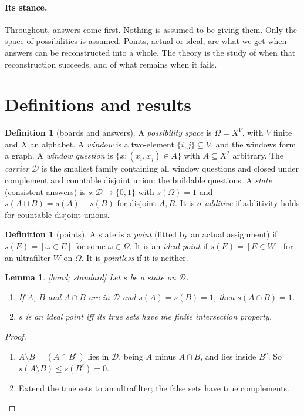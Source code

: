 \documentclass[11pt]{article}
\theoremstyle{plain}
\newtheorem{lemma}[theorem]{Lemma}
\theoremstyle{definition}
\newtheorem{definition}[theorem]{Definition}
\newcommand{\cD}{\mathcal{D}}
\newcommand{\st}[1]{\textsf{\small[#1]}}
\begin{document}
\paragraph{Its stance.} Throughout, answers come first. Nothing is assumed to
be giving them. Only the space of possibilities is assumed. Points, actual or
ideal, are what we get when answers can be reconstructed into a whole. The
theory is the study of when that reconstruction succeeds, and of what remains
when it fails.

\appendix
\section{Definitions and results}\label{app:defs}

\begin{definition}[boards and answers]
A \emph{possibility space} is $\Omega=X^V$, with $V$ finite and $X$ an alphabet.
A \emph{window} is a two-element $\{i,j\}\subseteq V$, and the windows form a
graph. A \emph{window question} is $\{x:(x_i,x_j)\in A\}$ with $A\subseteq X^2$
arbitrary. The \emph{carrier} $\cD$ is the smallest family containing all window
questions and closed under complement and countable disjoint union: the
buildable questions. A \emph{state} (consistent answers) is
$s:\cD\to\{0,1\}$ with $s(\Omega)=1$ and $s(A\sqcup B)=s(A)+s(B)$ for disjoint
$A,B$. It is \emph{$\sigma$-additive} if additivity holds for countable disjoint
unions.
\end{definition}

\begin{definition}[points]
A state is a \emph{point} (fitted by an actual assignment) if
$s(E)=[\omega\in E]$ for some $\omega\in\Omega$. It is an \emph{ideal point} if
$s(E)=[E\in W]$ for an ultrafilter $W$ on $\Omega$. It is \emph{pointless} if it
is neither.
\end{definition}

\begin{lemma}\label{lem:basic}\st{hand; standard}
Let $s$ be a state on $\cD$.
\begin{enumerate}[label=(\alph*),nosep]
  \item If $A$, $B$ and $A\cap B$ are in $\cD$ and $s(A)=s(B)=1$, then
    $s(A\cap B)=1$.
  \item $s$ is an ideal point iff its true sets have the finite intersection
    property.
\end{enumerate}
\end{lemma}
\begin{proof}
\begin{enumerate}[label=(\alph*),nosep]
  \item $A\setminus B=(A\cap B^c)$ lies in $\cD$, being $A$ minus $A\cap B$, and
    lies inside $B^c$. So $s(A\setminus B)\le s(B^c)=0$.
  \item Extend the true sets to an ultrafilter; the false sets have true
    complements.
\end{enumerate}
\end{proof}
\end{document}
